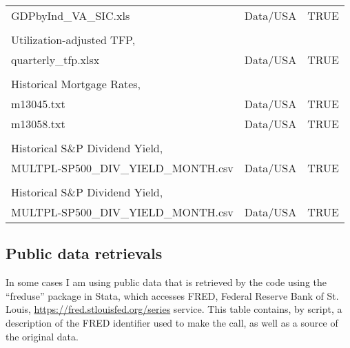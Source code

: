 \documentclass[11pt]{article}
\begin{document}
\begin{longtable}{p{4.5in}p{1in}p{1in}}
GDPbyInd\_VA\_SIC.xls & Data/USA & TRUE \\
\\
\multicolumn{3}{l}{Utilization-adjusted TFP, \cite{fernald2014}} \\ \midrule
quarterly\_tfp.xlsx & Data/USA & TRUE \\
\\
\multicolumn{3}{l}{Historical Mortgage Rates, \cite{nberhistory}} \\ \midrule
m13045.txt & Data/USA & TRUE \\
m13058.txt & Data/USA & TRUE \\
\\
\multicolumn{3}{l}{Historical S\&P Dividend Yield, \cite{shiller}} \\ \midrule
MULTPL-SP500\_DIV\_YIELD\_MONTH.csv & Data/USA & TRUE \\
\\
\multicolumn{3}{l}{Historical S\&P Dividend Yield, \cite{shiller}} \\ \midrule
MULTPL-SP500\_DIV\_YIELD\_MONTH.csv & Data/USA & TRUE \\
\end{longtable}

\subsection{Public data retrievals}
In some cases I am using public data that is retrieved by the code using the ``freduse'' package in Stata, which accesses FRED, Federal Reserve Bank of St. Louis, \url{https://fred.stlouisfed.org/series} service. This table contains, by script, a description of the FRED identifier used to make the call, as well as a source of the original data.
\end{document}
